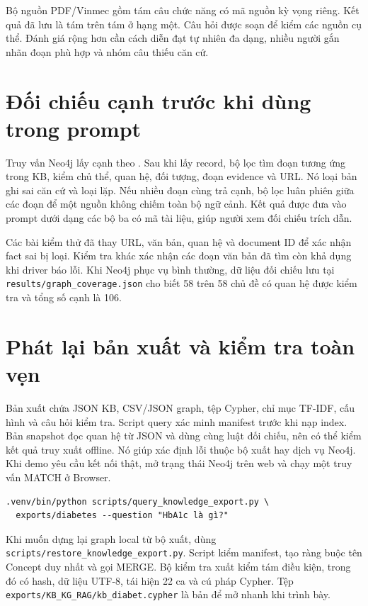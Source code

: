 

Bộ nguồn PDF/Vinmec gồm tám câu chức năng có mã nguồn kỳ vọng riêng. Kết quả đã lưu là tám trên tám ở hạng một. Câu hỏi được soạn để kiểm các nguồn cụ thể. Đánh giá rộng hơn cần cách diễn đạt tự nhiên đa dạng, nhiều người gắn nhãn đoạn phù hợp và nhóm câu thiếu căn cứ.

\section{Đối chiếu cạnh trước khi dùng trong prompt}
Truy vấn Neo4j lấy cạnh theo . Sau khi lấy record, bộ lọc tìm đoạn tương ứng trong KB, kiểm chủ thể, quan hệ, đối tượng, đoạn evidence và URL. Nó loại bản ghi sai căn cứ và loại lặp. Nếu nhiều đoạn cùng trả cạnh, bộ lọc luân phiên giữa các đoạn để một nguồn không chiếm toàn bộ ngữ cảnh. Kết quả được đưa vào prompt dưới dạng các bộ ba có mã tài liệu, giúp người xem đối chiếu trích dẫn.

Các bài kiểm thử đã thay URL, văn bản, quan hệ và document ID để xác nhận fact sai bị loại. Kiểm tra khác xác nhận các đoạn văn bản đã tìm còn khả dụng khi driver báo lỗi. Khi Neo4j phục vụ bình thường, dữ liệu đối chiếu lưu tại \nolinkurl{results/graph_coverage.json} cho biết 58 trên 58 chủ đề có quan hệ được kiểm tra và tổng số cạnh là 106.

\section{Phát lại bản xuất và kiểm tra toàn vẹn}
Bản xuất chứa JSON KB, CSV/JSON graph, tệp Cypher, chỉ mục TF-IDF, cấu hình và câu hỏi kiểm tra. Script query xác minh manifest trước khi nạp index. Bản snapshot đọc quan hệ từ JSON và dùng cùng luật đối chiếu, nên có thể kiểm kết quả truy xuất offline. Nó giúp xác định lỗi thuộc bộ xuất hay dịch vụ Neo4j. Khi demo yêu cầu kết nối thật, mở trạng thái Neo4j trên web và chạy một truy vấn MATCH ở Browser.

\begin{Verbatim}[fontsize=\small]
.venv/bin/python scripts/query_knowledge_export.py \
  exports/diabetes --question "HbA1c là gì?"
\end{Verbatim}

Khi muốn dựng lại graph local từ bộ xuất, dùng \nolinkurl{scripts/restore_knowledge_export.py}. Script kiểm manifest, tạo ràng buộc tên Concept duy nhất và gọi MERGE. Bộ kiểm tra xuất kiểm tám điều kiện, trong đó có hash, dữ liệu UTF-8, tái hiện 22 ca và cú pháp Cypher. Tệp \nolinkurl{exports/KB_KG_RAG/kb_diabet.cypher} là bản để mở nhanh khi trình bày.

